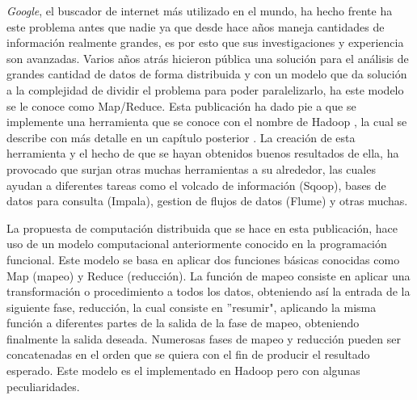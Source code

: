 \textit{Google}, el buscador de internet m\'as utilizado en el mundo, ha hecho frente ha este problema antes que nadie ya que desde hace a\~nos maneja cantidades de información realmente grandes, es por esto que sus investigaciones y experiencia son avanzadas. Varios a\~nos atrás hicieron p\'ublica \cite{paper-mapreduce} una solución para el an\'alisis de grandes cantidad de datos de forma distribuida y con un modelo que da soluci\'on a la complejidad de dividir el problema para poder paralelizarlo, ha este modelo se le conoce como Map/Reduce. Esta publicación ha dado pie a que se implemente una herramienta que se conoce con el nombre de Hadoop \cite{hadoop}, la cual se describe con m\'as detalle en un cap\'itulo posterior . La creaci\'on de esta herramienta y el hecho de que se hayan obtenidos buenos resultados de ella, ha provocado que surjan otras muchas herramientas a su alrededor, las cuales ayudan a diferentes tareas como el volcado de información (Sqoop), bases de datos para consulta (Impala), gestion de flujos de datos (Flume) y otras muchas.

La propuesta de computación distribuida que se hace en esta publicación, hace uso de un modelo computacional anteriormente conocido en la programación funcional. Este modelo se basa en aplicar dos funciones básicas conocidas como Map (mapeo) y Reduce (reducci\'on). La función de mapeo consiste en aplicar una transformación o procedimiento a todos los datos, obteniendo así la entrada de la siguiente fase, reducción, la cual consiste en ''resumir", aplicando la misma función a diferentes partes de la salida de la fase de mapeo, obteniendo finalmente la salida deseada. Numerosas fases de mapeo y reducción pueden ser concatenadas en el orden que se quiera con el fin de producir el resultado esperado. Este modelo es el implementado en Hadoop pero con algunas peculiaridades.
